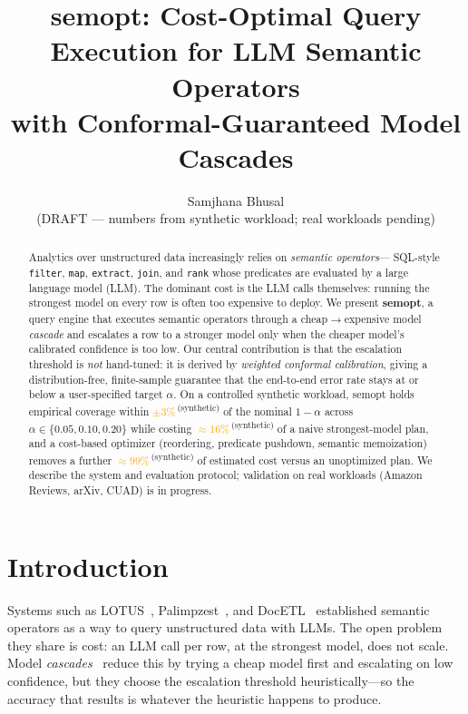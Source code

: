 \documentclass[10pt,twocolumn]{article}
\title{\textbf{semopt}: Cost-Optimal Query Execution for LLM Semantic Operators\\
\large with Conformal-Guaranteed Model Cascades}
\author{Samjhana Bhusal\\ \small (DRAFT --- numbers from synthetic workload; real workloads pending)}
\date{}
\newcommand{\synthetic}[1]{\textcolor{orange}{#1}\,\textsuperscript{(synthetic)}}
\begin{document}
\maketitle

\begin{abstract}
Analytics over unstructured data increasingly relies on \emph{semantic operators}---
SQL-style \texttt{filter}, \texttt{map}, \texttt{extract}, \texttt{join}, and \texttt{rank}
whose predicates are evaluated by a large language model (LLM). The dominant cost is the
LLM calls themselves: running the strongest model on every row is often too expensive to
deploy. We present \textbf{semopt}, a query engine that executes semantic operators
through a cheap$\rightarrow$expensive model \emph{cascade} and escalates a row to a
stronger model only when the cheaper model's calibrated confidence is too low. Our central
contribution is that the escalation threshold is \emph{not} hand-tuned: it is derived by
\emph{weighted conformal calibration}, giving a distribution-free, finite-sample guarantee
that the end-to-end error rate stays at or below a user-specified target $\alpha$. On a
controlled synthetic workload, semopt holds empirical coverage within
\synthetic{$\pm 3\%$} of the nominal $1-\alpha$ across $\alpha \in \{0.05, 0.10, 0.20\}$
while costing \synthetic{$\approx 16\%$} of a naive strongest-model plan, and a cost-based
optimizer (reordering, predicate pushdown, semantic memoization) removes a further
\synthetic{$\approx 99\%$} of estimated cost versus an unoptimized plan. We describe the
system and evaluation protocol; validation on real workloads (Amazon Reviews, arXiv, CUAD)
is in progress.
\end{abstract}

\section{Introduction}
Systems such as LOTUS~\cite{lotus}, Palimpzest~\cite{palimpzest}, and
DocETL~\cite{docetl} established semantic operators as a way to query unstructured data
with LLMs. The open problem they share is cost: an LLM call per row, at the strongest
model, does not scale. Model \emph{cascades}~\cite{frugalgpt} reduce this by trying a cheap
model first and escalating on low confidence, but they choose the escalation threshold
heuristically---so the accuracy that results is whatever the heuristic happens to produce.
\end{document}
